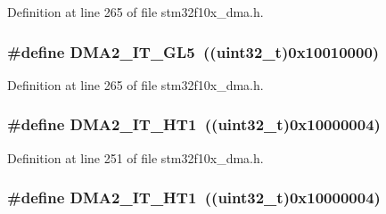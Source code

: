 Definition at line 265 of file stm32f10x\+\_\+dma.\+h.

\subsubsection[{\texorpdfstring{D\+M\+A2\+\_\+\+I\+T\+\_\+\+G\+L5}{DMA2_IT_GL5}}]{\setlength{\rightskip}{0pt plus 5cm}\#define D\+M\+A2\+\_\+\+I\+T\+\_\+\+G\+L5~(({\bf uint32\+\_\+t})0x10010000)}\hypertarget{group___d_m_a__interrupts__definition_ga2205d7e002767d98f7aa206634374082}{}\label{group___d_m_a__interrupts__definition_ga2205d7e002767d98f7aa206634374082}


Definition at line 265 of file stm32f10x\+\_\+dma.\+h.

\subsubsection[{\texorpdfstring{D\+M\+A2\+\_\+\+I\+T\+\_\+\+H\+T1}{DMA2_IT_HT1}}]{\setlength{\rightskip}{0pt plus 5cm}\#define D\+M\+A2\+\_\+\+I\+T\+\_\+\+H\+T1~(({\bf uint32\+\_\+t})0x10000004)}\hypertarget{group___d_m_a__interrupts__definition_gab9544576514917f9a1fcbb3100c3c2ae}{}\label{group___d_m_a__interrupts__definition_gab9544576514917f9a1fcbb3100c3c2ae}


Definition at line 251 of file stm32f10x\+\_\+dma.\+h.

\subsubsection[{\texorpdfstring{D\+M\+A2\+\_\+\+I\+T\+\_\+\+H\+T1}{DMA2_IT_HT1}}]{\setlength{\rightskip}{0pt plus 5cm}\#define D\+M\+A2\+\_\+\+I\+T\+\_\+\+H\+T1~(({\bf uint32\+\_\+t})0x10000004)}\hypertarget{group___d_m_a__interrupts__definition_gab9544576514917f9a1fcbb3100c3c2ae}{}\label{group___d_m_a__interrupts__definition_gab9544576514917f9a1fcbb3100c3c2ae}


